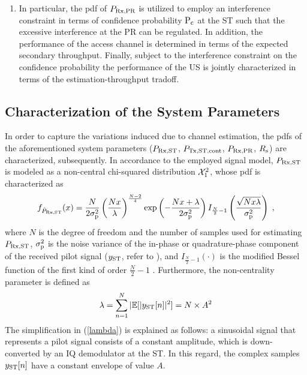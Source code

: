 \begin{enumerate}
	\item In particular, the pdf of $P_{\text{Rx,PR}}$ is utilized to employ an interference constraint in terms of confidence probability $\text{P}_{\text{c}}$ at the ST such that the excessive interference at the PR can be regulated. In addition, the performance of the access channel is determined in terms of the expected secondary throughput. Finally, subject to the interference constraint on the confidence probability the performance of the US is jointly characterized in terms of the estimation-throughput tradoff. 
\end{enumerate}

\subsection{Characterization of the System Parameters}
In order to capture the variations induced due to channel estimation, the pdfs of the aforementioned system parameters ($P_{\text{Rx,ST}}$, $P_{\text{Tx,ST,cont}}$, $P_{\text{Rx,PR}}$, $R_{\text{s}}$) are characterized, subsequently. In accordance to the employed signal model, $P_{\text{Rx,ST}}$ is modeled as a non-central chi-squared distribution $\ncchi2$, whose pdf is characterized as \cite{Char99}
\begin{equation}
	\label{nxc2equ}
	f_{\hat{P}_{\text{Rx,ST}}} (x) = 
	\frac{N}{2\sigma_\textrm{p}^2} \left(\frac{N x}{\lambda}\right)^\frac{N-2}{4}  
	\exp\left(-\frac{N x+\lambda}{2\sigma_\textrm{p}^2}\right)  I_{\frac{N}{2}-1}\left(\frac{\sqrt{N x\lambda}}{\sigma_\textrm{p}^2}\right) \;  ,
\end{equation}
where $N$ is the degree of freedom and the number of samples used for estimating $P_{\text{Rx,ST}}$, $\sigma^2_{\text{p}}$ is the noise variance of the in-phase or quadrature-phase component of the received pilot signal ($y_{\text{ST}}$, refer to \cite{Kaushik15}), and $I_{\frac{N}{2}-1}(\cdot)$ is the modified Bessel function of the first kind of order $\frac{N}{2}-1$ \cite{Jef00}. Furthermore, the non-centrality parameter is defined as
\begin{equation}
	\label{lambda}
	\lambda = \sum_{n=1}^N |\mathbb{E}[|y_{\text{ST}}[n]|^2] = N \times A^2
\end{equation}
The simplification in  (\ref{lambda}) is explained as follows: a sinusoidal signal that represents a pilot signal consists of a constant amplitude, which is down-converted by an IQ demodulator at the ST. In this regard, the complex samples $y_{\text{ST}}[n]$ have a constant envelope of value $A$. 

